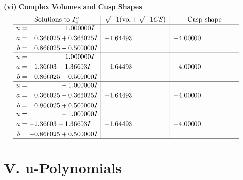 \documentclass[1p]{elsarticle_modified}
\theoremstyle{definition}
\newcommand{\I}{\sqrt{-1}}
\begin{document}
\newpage\flushleft \textbf{(vi) Complex Volumes and Cusp Shapes}
$$\begin{array}{c|c|c}  
\text{Solutions to }I^u_{4}& \I (\text{vol} + \sqrt{-1}CS) & \text{Cusp shape}\\
 \hline 
\begin{aligned}
u &= \phantom{-0.000000 -}1.000000 I \\
a &= \phantom{-}0.366025 + 0.366025 I \\
b &= \phantom{-}0.866025 - 0.500000 I\end{aligned}
 & -1.64493\phantom{ +0.000000I} & -4.00000\phantom{ +0.000000I} \\ \hline\begin{aligned}
u &= \phantom{-0.000000 -}1.000000 I \\
a &= -1.36603 - 1.36603 I \\
b &= -0.866025 - 0.500000 I\end{aligned}
 & -1.64493\phantom{ +0.000000I} & -4.00000\phantom{ +0.000000I} \\ \hline\begin{aligned}
u &= \phantom{-0.000000 } -1.000000 I \\
a &= \phantom{-}0.366025 - 0.366025 I \\
b &= \phantom{-}0.866025 + 0.500000 I\end{aligned}
 & -1.64493\phantom{ +0.000000I} & -4.00000\phantom{ +0.000000I} \\ \hline\begin{aligned}
u &= \phantom{-0.000000 } -1.000000 I \\
a &= -1.36603 + 1.36603 I \\
b &= -0.866025 + 0.500000 I\end{aligned}
 & -1.64493\phantom{ +0.000000I} & -4.00000\phantom{ +0.000000I}\\
 \hline 
 \end{array}$$\newpage
\newpage\renewcommand{\arraystretch}{1}
\centering \section*{ V. u-Polynomials}
\end{document}
